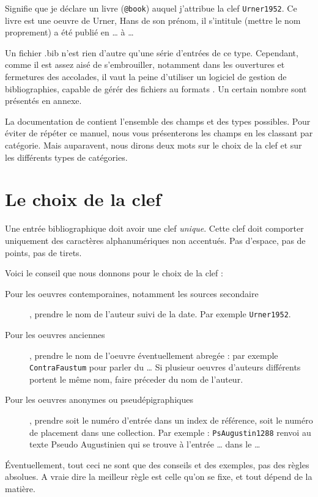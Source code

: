 Signifie que je déclare un livre (\verb|@book|) auquel j'attribue la clef \verb|Urner1952|. Ce livre est une oeuvre de Urner, Hans de son prénom, il s'intitule (mettre le nom proprement) a été publié en … à …

Un fichier .bib n'est rien d'autre qu'une  série d'entrées de ce type. Cependant, comme il est assez aisé de s'embrouiller, notamment dans les ouvertures et fermetures des accolades, il vaut la peine d'utiliser un logiciel de gestion de bibliographies, capable de gérér  des fichiers au formats . Un certain nombre sont présentés en annexe.

La documentation de  contient l'ensemble des champs et des types possibles. Pour éviter de répéter ce manuel, nous vous présenterons les champs en les classant par catégorie. Mais auparavent, nous dirons deux mots sur le choix de la clef et sur les différents types de catégories.

\section{Le choix de la clef}

Une entrée bibliographique doit avoir une clef \emph{unique}. Cette clef doit comporter uniquement des caractères alphanumériques non accentués. Pas d'espace, pas de points, pas de tirets.

Voici le conseil que nous donnons pour le choix de la clef :
\begin{description}
\item[Pour les oeuvres contemporaines, notamment les sources secondaire], prendre le nom de l'auteur suivi de la date. Par exemple \verb|Urner1952|.
\item[Pour les oeuvres anciennes], prendre le nom de l'oeuvre  éventuellement abregée : par exemple \verb|ContraFaustum| pour parler du … Si plusieur oeuvres d'auteurs différents portent le même nom, faire préceder du nom de l'auteur.
\item[Pour les oeuvres anonymes ou pseudépigraphiques], prendre soit le numéro d'entrée dans un index de référence, soit le numéro de placement dans une collection. Par exemple : \verb|PsAugustin1288| renvoi au texte Pseudo Augustinien qui se trouve à l'entrée … dans le …
\end{description}


Éventuellement, tout ceci ne sont que des conseils et des exemples, pas des règles absolues. A vraie dire la meilleur règle est celle qu'on se fixe, et tout dépend de la matière.

